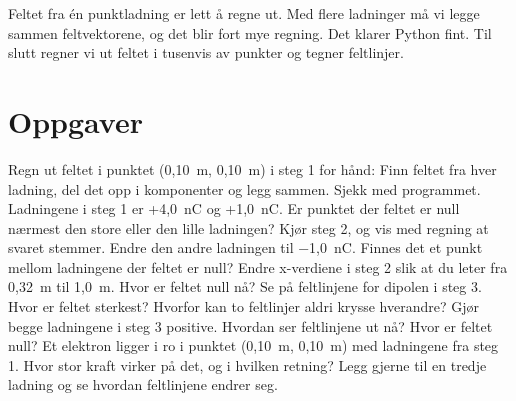 \documentclass[11pt]{article}
\begin{document}

Feltet fra én punktladning er lett å regne ut. Med flere ladninger må vi legge sammen feltvektorene, og det blir fort mye regning. Det klarer Python fint. Til slutt regner vi ut feltet i tusenvis av punkter og tegner feltlinjer.

\section*{Oppgaver}

\begin{oppgaveliste}
\oppgave {}Regn ut feltet i punktet (0,10~m, 0,10~m) i steg 1 for hånd: Finn feltet fra hver ladning, del det opp i komponenter og legg sammen. Sjekk med programmet.
\svar
\oppgave {}Ladningene i steg 1 er +4,0~nC og +1,0~nC. Er punktet der feltet er null nærmest den store eller den lille ladningen? Kjør steg 2, og vis med regning at svaret stemmer.
\svar
\oppgave {}Endre den andre ladningen til −1,0~nC. Finnes det et punkt mellom ladningene der feltet er null? Endre x-verdiene i steg 2 slik at du leter fra 0,32~m til 1,0~m. Hvor er feltet null nå?
\svar
\oppgave {}Se på feltlinjene for dipolen i steg 3. Hvor er feltet sterkest? Hvorfor kan to feltlinjer aldri krysse hverandre?
\svar
\oppgave {}Gjør begge ladningene i steg 3 positive. Hvordan ser feltlinjene ut nå? Hvor er feltet null?
\svar
\oppgave {}Et elektron ligger i ro i punktet (0,10~m, 0,10~m) med ladningene fra steg 1. Hvor stor kraft virker på det, og i hvilken retning? Legg gjerne til en tredje ladning og se hvordan feltlinjene endrer seg.
\svar
\end{oppgaveliste}
\end{document}
